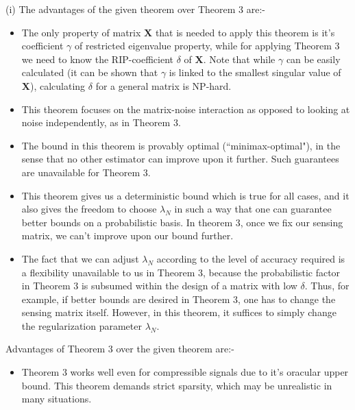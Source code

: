 \documentclass[a4paper,11pt]{article}
\numberwithin{definition}{section}
\numberwithin{mytheorem}{subsection}
\begin{document}
(i) The advantages of the given theorem over Theorem 3 are:-
\begin{itemize}
    \item The only property of matrix $\boldsymbol{X}$ that is needed to apply this theorem is it's coefficient $\gamma$ of restricted eigenvalue property, while for applying Theorem 3 we need to know the RIP-coefficient $\delta$ of $\boldsymbol{X}$. Note that while $\gamma$ can be easily calculated (it can be shown that $\gamma$ is linked to the smallest singular value of $\boldsymbol{X}$), calculating $\delta$ for a general matrix is NP-hard.
    \item This theorem focuses on the matrix-noise interaction as opposed to looking at noise independently, as in Theorem 3.
    \item The bound in this theorem is provably optimal (``minimax-optimal"), in the sense that no other estimator can improve upon it further. Such guarantees are unavailable for Theorem 3.
    \item This theorem gives us a deterministic bound which is true for all cases, and it also gives the freedom to choose $\lambda_N$ in such a way that one can guarantee better bounds on a probabilistic basis. In theorem 3, once we fix our sensing matrix, we can't improve upon our bound further.
    \item The fact that we can adjust $\lambda_N$ according to the level of accuracy required is a flexibility unavailable to us in Theorem 3, because the probabilistic factor in Theorem 3 is subsumed within the design of a matrix with low $\delta$. Thus, for example, if better bounds are desired in Theorem 3, one has to change the sensing matrix itself. However, in this theorem, it suffices to simply change the regularization parameter $\lambda_N$.
\end{itemize}
Advantages of Theorem 3 over the given theorem are:-
\begin{itemize}
    \item Theorem 3 works well even for compressible signals due to it's oracular upper bound. This theorem demands strict sparsity, which may be unrealistic in many situations.
\end{itemize}
\end{document}
